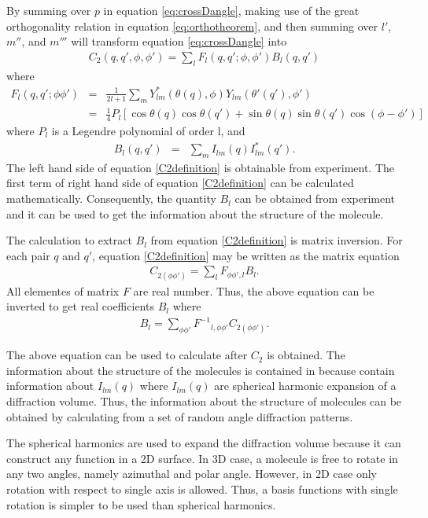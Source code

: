 By summing over $p$ in equation \ref{eq:crossDangle}, making use of the great orthogonality relation in equation \ref{eq:orthotheorem}, and then summing over $l'$, $m''$, and $m'''$ will transform equation \ref{eq:crossDangle} into 
\begin{eqnarray}
C_{2}(q,q',\phi,\phi') = \sum_{l} F_{l}(q,q';\phi,\phi') B_{l}(q,q')
\label{C2definition}
\end{eqnarray}
where
\begin{eqnarray}
F_{l}(q,q';\phi \phi') &=& \frac{1}{2l+1} \sum_{m} Y^{*}_{lm}(\theta(q),\phi) Y_{lm}(\theta'(q'),\phi') \\
&=&\frac{1}{4} P_{l} [\cos \theta (q) \cos \theta (q') + \sin \theta(q) \sin \theta(q') \cos(\phi-\phi') ]
\label{eq:FP}
\end{eqnarray}
where $P_{l}$ is a Legendre polynomial of order l, and
\begin{eqnarray}
B_{l}(q,q') &=& \sum_{m} I_{lm}(q) I_{lm}^{*}(q').
\label{eq:theB}
\end{eqnarray}
The left hand side of equation \ref{C2definition} is obtainable from experiment. The first term of right hand side of equation \ref{C2definition} can be calculated mathematically. Consequently, the quantity $B_{l}$ can be obtained from experiment and it can be used to get the information about the structure of the molecule.

The calculation to extract $B_{l}$ from equation \ref{C2definition} is matrix inversion. For each pair $q$ and $q'$, equation \ref{C2definition}  may be written as the matrix equation
\begin{eqnarray}
C_{2(\phi\phi')}=\sum_{l} F_{\phi\phi',l}B_{l}.
\end{eqnarray}
All elementes of matrix $F$ are real number. Thus, the above equation can be inverted to get real coefficients $B_{l}$ where
\begin{eqnarray}
B_{l}=\sum_{\phi \phi'} {F^{-1}}_{l,\phi \phi'} C_{2(\phi \phi')}.
\label{eq:Binvert}
\end{eqnarray}

The above equation can be used to calculate \Blq after $C_{2}$ is obtained. 
The information about the structure of the molecules is contained in \Blq because \Blq contain information about $I_{lm}(q)$ where $I_{lm}(q)$ are spherical harmonic expansion of a diffraction volume. Thus, the information about the structure of molecules can be obtained by calculating \Blq from a set of random angle diffraction patterns.

The spherical harmonics are used to expand the diffraction volume because it can construct any function in a 2D surface. In 3D case, a molecule is free to rotate in any two angles, namely azimuthal and polar angle. However, in 2D case only rotation with respect to single axis is allowed. Thus, a basis functions with single rotation is simpler to be used than spherical harmonics. 

